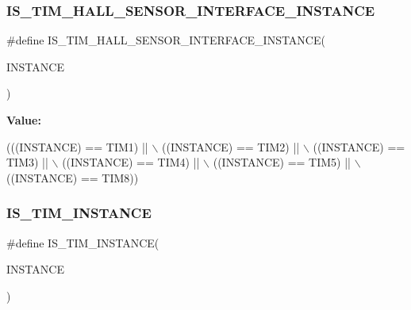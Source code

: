\subsubsection{\texorpdfstring{I\+S\+\_\+\+T\+I\+M\+\_\+\+H\+A\+L\+L\+\_\+\+S\+E\+N\+S\+O\+R\+\_\+\+I\+N\+T\+E\+R\+F\+A\+C\+E\+\_\+\+I\+N\+S\+T\+A\+N\+CE}{IS\_TIM\_HALL\_SENSOR\_INTERFACE\_INSTANCE}}
{\footnotesize\ttfamily \#define I\+S\+\_\+\+T\+I\+M\+\_\+\+H\+A\+L\+L\+\_\+\+S\+E\+N\+S\+O\+R\+\_\+\+I\+N\+T\+E\+R\+F\+A\+C\+E\+\_\+\+I\+N\+S\+T\+A\+N\+CE(\begin{DoxyParamCaption}\item[{}]{I\+N\+S\+T\+A\+N\+CE }\end{DoxyParamCaption})}

{\bfseries Value\+:}
\begin{DoxyCode}
(((INSTANCE) == TIM1) || \(\backslash\)
                                                          ((INSTANCE) == TIM2) || \(\backslash\)
                                                          ((INSTANCE) == TIM3) || \(\backslash\)
                                                          ((INSTANCE) == TIM4) || \(\backslash\)
                                                          ((INSTANCE) == TIM5) || \(\backslash\)
                                                          ((INSTANCE) == TIM8))
\end{DoxyCode}
\mbox{\label{group___exported__macros_gaba506eb03409b21388d7c5a6401a4f98}} 
\subsubsection{\texorpdfstring{I\+S\+\_\+\+T\+I\+M\+\_\+\+I\+N\+S\+T\+A\+N\+CE}{IS\_TIM\_INSTANCE}}
{\footnotesize\ttfamily \#define I\+S\+\_\+\+T\+I\+M\+\_\+\+I\+N\+S\+T\+A\+N\+CE(\begin{DoxyParamCaption}\item[{}]{I\+N\+S\+T\+A\+N\+CE }\end{DoxyParamCaption})}

